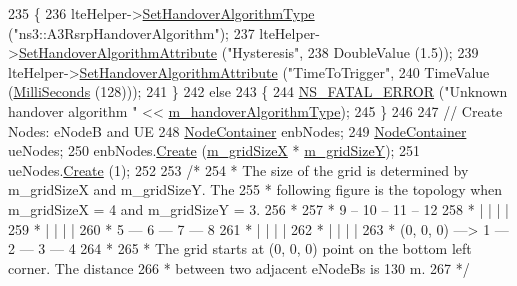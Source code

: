 \begin{DoxyCode}
235     \{
236       lteHelper->\hyperlink{classns3_1_1LteHelper_a6301630b8a7082043efff2a7aaaa1d20}{SetHandoverAlgorithmType} (\textcolor{stringliteral}{"ns3::A3RsrpHandoverAlgorithm"});
237       lteHelper->\hyperlink{classns3_1_1LteHelper_a4da448bb1d3d13534cc54f6b7d33f26a}{SetHandoverAlgorithmAttribute} (\textcolor{stringliteral}{"Hysteresis"},
238                                                 DoubleValue (1.5));
239       lteHelper->\hyperlink{classns3_1_1LteHelper_a4da448bb1d3d13534cc54f6b7d33f26a}{SetHandoverAlgorithmAttribute} (\textcolor{stringliteral}{"TimeToTrigger"},
240                                                 TimeValue (\hyperlink{group__timecivil_gaf26127cf4571146b83a92ee18679c7a9}{MilliSeconds} (128)));
241     \}
242   \textcolor{keywordflow}{else}
243     \{
244       \hyperlink{group__fatal_ga5131d5e3f75d7d4cbfd706ac456fdc85}{NS\_FATAL\_ERROR} (\textcolor{stringliteral}{"Unknown handover algorithm "} << 
      \hyperlink{classLteHandoverTargetTestCase_a2bc86aca3c0c446f90d26a572a58d2b9}{m\_handoverAlgorithmType});
245     \}
246 
247   \textcolor{comment}{// Create Nodes: eNodeB and UE}
248   \hyperlink{classns3_1_1NodeContainer}{NodeContainer} enbNodes;
249   \hyperlink{classns3_1_1NodeContainer}{NodeContainer} ueNodes;
250   enbNodes.\hyperlink{classns3_1_1NodeContainer_a787f059e2813e8b951cc6914d11dfe69}{Create} (\hyperlink{classLteHandoverTargetTestCase_ad4b214cbc0eba746b7f87d8de07c5cce}{m\_gridSizeX} * \hyperlink{classLteHandoverTargetTestCase_a2abec8dc89b147c33071eca7475255e3}{m\_gridSizeY});
251   ueNodes.\hyperlink{classns3_1_1NodeContainer_a787f059e2813e8b951cc6914d11dfe69}{Create} (1);
252 
253   \textcolor{comment}{/*}
254 \textcolor{comment}{   * The size of the grid is determined by m\_gridSizeX and m\_gridSizeY. The}
255 \textcolor{comment}{   * following figure is the topology when m\_gridSizeX = 4 and m\_gridSizeY = 3.}
256 \textcolor{comment}{   *}
257 \textcolor{comment}{   *                  9 -- 10 -- 11 -- 12}
258 \textcolor{comment}{   *                  |     |     |     |}
259 \textcolor{comment}{   *                  |     |     |     |}
260 \textcolor{comment}{   *                  5 --- 6 --- 7 --- 8}
261 \textcolor{comment}{   *                  |     |     |     |}
262 \textcolor{comment}{   *                  |     |     |     |}
263 \textcolor{comment}{   *   (0, 0, 0) ---> 1 --- 2 --- 3 --- 4}
264 \textcolor{comment}{   *}
265 \textcolor{comment}{   * The grid starts at (0, 0, 0) point on the bottom left corner. The distance}
266 \textcolor{comment}{   * between two adjacent eNodeBs is 130 m.}
267 \textcolor{comment}{   */}

\end{DoxyCode}
